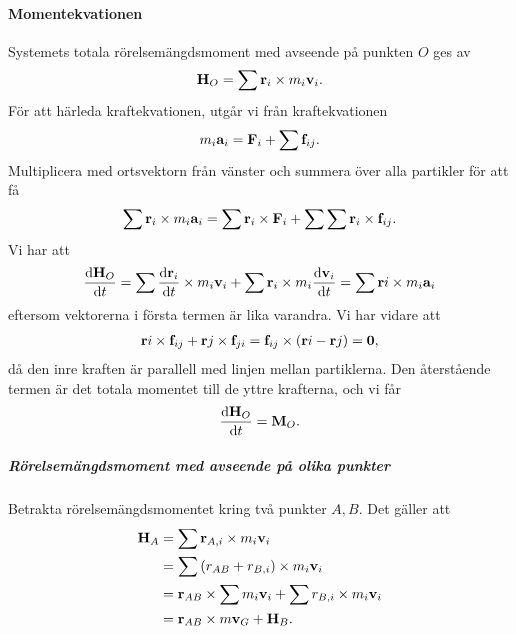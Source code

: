 \paragraph{Momentekvationen}
Systemets totala rörelsemängdsmoment med avseende på punkten $O$ ges av
\begin{align*}
	\vb{H}_{O} = \sum\vb{r}_{i}\times m_{i}\vb{v}_{i}.
\end{align*}
För att härleda kraftekvationen, utgår vi från kraftekvationen
\begin{align*}
	m_{i}\vb{a}_{i} = \vb{F}_{i} + \sum\vb{f}_{ij}.
\end{align*}
Multiplicera med ortsvektorn från vänster och summera över alla partikler för att få
\begin{align*}
	\sum\vb{r}_{i}\times m_{i}\vb{a}_{i} = \sum\vb{r}_{i}\times\vb{F}_{i} + \sum\sum\vb{r}_{i}\times\vb{f}_{ij}.
\end{align*}
Vi har att
\begin{align*}
	\dv{\vb{H}_{O}}{t} = \sum\dv{\vb{r}_{i}}{t}\times m_{i}\vb{v}_{i} + \sum\vb{r}_{i}\times m_{i}\dv{\vb{v}_{i}}{t} = \sum\vb{r}{i}\times m_{i}\vb{a}_{i}
\end{align*}
eftersom vektorerna i första termen är lika varandra. Vi har vidare att
\begin{align*}
	\vb{r}{i}\times\vb{f}_{ij} + \vb{r}{j}\times\vb{f}_{ji} = \vb{f}_{ij}\times (\vb{r}{i} - \vb{r}{j}) = \vb{0},
\end{align*}
då den inre kraften är parallell med linjen mellan partiklerna. Den återstående termen är det totala momentet till de yttre krafterna, och vi får
\begin{align*}
	\dv{\vb{H}_{O}}{t} = \vb{M}_{O}.
\end{align*}

\subparagraph{Rörelsemängdsmoment med avseende på olika punkter}
Betrakta rörelsemängdsmomentet kring två punkter $A, B$. Det gäller att
\begin{align*}
	\vb{H}_{A} &= \sum\vb{r}_{A, i}\times m_{i}\vb{v}_{i} \\
	           &= \sum\vb({r}_{AB} + {r}_{B, i})\times m_{i}\vb{v}_{i} \\
	           &= \vb{r}_{AB}\times\sum m_{i}\vb{v}_{i} + \sum {r}_{B, i}\times m_{i}\vb{v}_{i} \\
	           &= \vb{r}_{AB}\times m\vb{v}_{G} + \vb{H}_{B}.
\end{align*}

